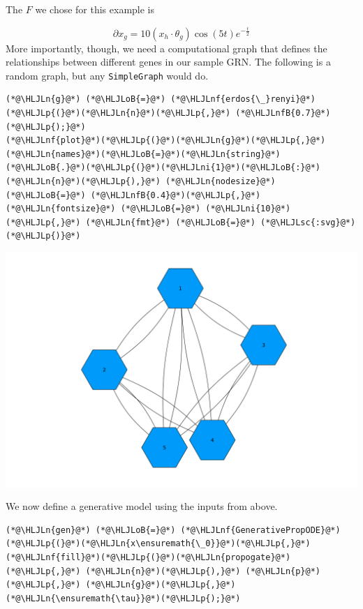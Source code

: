 \documentclass[12pt,a4paper]{article}
\newcommand{\HLJLn}[1]{#1}
\newcommand{\HLJLnf}[1]{\textcolor[RGB]{66,102,213}{#1}}
\newcommand{\HLJLsc}[1]{\textcolor[RGB]{201,61,57}{#1}}
\newcommand{\HLJLnfB}[1]{\textcolor[RGB]{59,151,46}{#1}}
\newcommand{\HLJLni}[1]{\textcolor[RGB]{59,151,46}{#1}}
\newcommand{\HLJLoB}[1]{\textcolor[RGB]{102,102,102}{\textbf{#1}}}
\newcommand{\HLJLp}[1]{#1}
\begin{document}
The $F$ we chose for this example is

\[
\partial x_g = 10(x_h \cdot \theta_g)\cos(5t)e^{-\frac{t}{2}}
\]
More importantly, though, we need a computational graph that defines the relationships between different genes in our sample GRN. The following is a random graph, but any \texttt{SimpleGraph} would do.


\begin{lstlisting}
(*@\HLJLn{g}@*) (*@\HLJLoB{=}@*) (*@\HLJLnf{erdos{\_}renyi}@*)(*@\HLJLp{(}@*)(*@\HLJLn{n}@*)(*@\HLJLp{,}@*) (*@\HLJLnfB{0.7}@*)(*@\HLJLp{);}@*)
(*@\HLJLnf{plot}@*)(*@\HLJLp{(}@*)(*@\HLJLn{g}@*)(*@\HLJLp{,}@*) (*@\HLJLn{names}@*)(*@\HLJLoB{=}@*)(*@\HLJLn{string}@*)(*@\HLJLoB{.}@*)(*@\HLJLp{(}@*)(*@\HLJLni{1}@*)(*@\HLJLoB{:}@*)(*@\HLJLn{n}@*)(*@\HLJLp{),}@*) (*@\HLJLn{nodesize}@*) (*@\HLJLoB{=}@*) (*@\HLJLnfB{0.4}@*)(*@\HLJLp{,}@*) (*@\HLJLn{fontsize}@*) (*@\HLJLoB{=}@*) (*@\HLJLni{10}@*)(*@\HLJLp{,}@*) (*@\HLJLn{fmt}@*) (*@\HLJLoB{=}@*) (*@\HLJLsc{:svg}@*)(*@\HLJLp{)}@*)
\end{lstlisting}

\includegraphics[width=\linewidth]{jl_IBhjS5/generative_2_1.png}

We now define a generative model using the inputs from above.


\begin{lstlisting}
(*@\HLJLn{gen}@*) (*@\HLJLoB{=}@*) (*@\HLJLnf{GenerativePropODE}@*)(*@\HLJLp{(}@*)(*@\HLJLn{x\ensuremath{\_0}}@*)(*@\HLJLp{,}@*) (*@\HLJLnf{fill}@*)(*@\HLJLp{(}@*)(*@\HLJLn{propogate}@*)(*@\HLJLp{,}@*) (*@\HLJLn{n}@*)(*@\HLJLp{),}@*) (*@\HLJLn{p}@*)(*@\HLJLp{,}@*) (*@\HLJLn{g}@*)(*@\HLJLp{,}@*) (*@\HLJLn{\ensuremath{\tau}}@*)(*@\HLJLp{);}@*)
\end{lstlisting}
\end{document}
